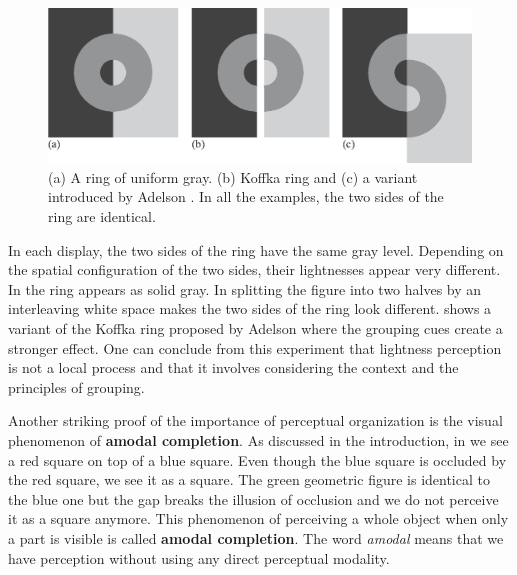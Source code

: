 \begin{figure}[t]
\centerline{
\includegraphics[width=1\linewidth]{figures/taxonomy/koffka_ring.eps}
} 
\caption{(a) A ring of uniform gray. (b) Koffka ring and (c) a variant introduced by Adelson \cite{Adelson99}.  In all the examples, the two sides of the ring are identical.} 
\label{fig:koffka_ring}
\end{figure}

In each display, the two sides of the ring have the same gray level. Depending on the spatial configuration of the two sides, their lightnesses appear very different. In  the ring appears as solid gray. In  splitting the figure into two halves by an interleaving white space makes the two sides of the ring look different.  shows a variant of the Koffka ring proposed by Adelson \cite{Adelson99} where the grouping cues create a stronger effect. One can conclude from this experiment that lightness perception is not a local process and that it involves considering the context and the principles of grouping.





Another striking proof of the importance of perceptual organization is the visual phenomenon of {\bf amodal completion}. 
As discussed in the introduction, in  we see a red square on top of a blue square. Even though the blue square is occluded by the red square, we see it as a square. The green geometric figure is identical to the blue one but the gap breaks the illusion of occlusion and we do not perceive it as a square anymore. This phenomenon of perceiving a whole object when only a part is visible is called {\bf amodal completion}. The word {\em amodal} means that we have perception without using any direct perceptual modality. 

